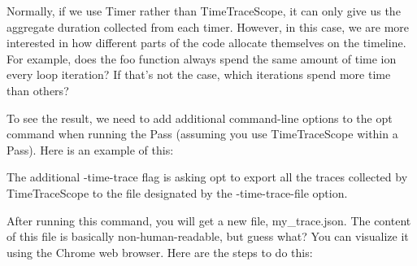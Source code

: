 Normally, if we use Timer rather than TimeTraceScope, it can only give us the aggregate duration collected from each timer. However, in this case, we are more interested in how different parts of the code allocate themselves on the timeline. For example, does the foo function always spend the same amount of time ion every loop iteration? If that's not the case, which iterations spend more time than others?

To see the result, we need to add additional command-line options to the opt command when running the Pass (assuming you use TimeTraceScope within a Pass). Here is an example of this:


The additional -time-trace flag is asking opt to export all the traces collected by TimeTraceScope to the file designated by the -time-trace-file option.

After running this command, you will get a new file, my\_trace.json. The content of this file is basically non-human-readable, but guess what? You can visualize it using the Chrome web browser. Here are the steps to do this:

